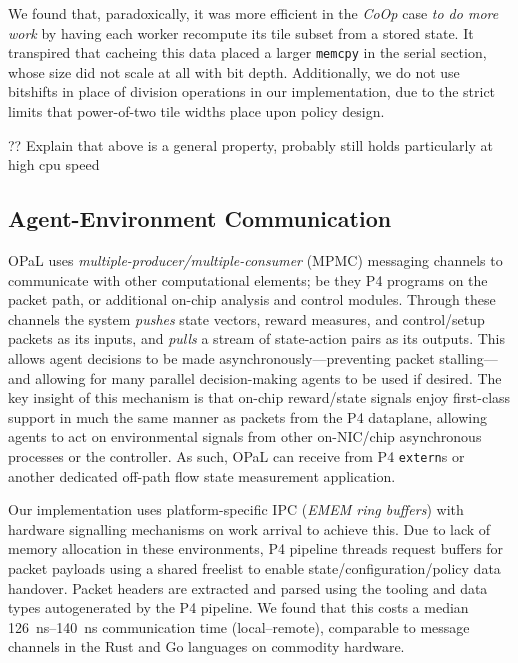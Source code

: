 \documentclass[
sigconf,natbib=false
]{acmart}
\newcommand{\approachshort}{OPaL}
\newcommand{\Coopfw}{\emph{CoOp}}
\begin{document}
We found that, paradoxically, it was more efficient in the \Coopfw{} case \emph{to do more work} by having each worker recompute its tile subset from a stored state.
It transpired that cacheing this data placed a larger \texttt{memcpy} in the serial section, whose size did not scale at all with bit depth.
Additionally, we do not use bitshifts in place of division operations in our implementation, due to the strict limits that power-of-two tile widths place upon policy design.

?? Explain that above is a general property, probably still holds particularly at high cpu speed

\subsection{Agent-Environment Communication}\label{sec:agent-environment-communication}
\approachshort{} uses \emph{multiple-producer/multiple-consumer} (MPMC) messaging channels to communicate with other computational elements; be they P4 programs on the packet path, or additional on-chip analysis and control modules.
Through these channels the system \emph{pushes} state vectors, reward measures, and control/setup packets as its inputs, and \emph{pulls} a stream of state-action pairs as its outputs.
This allows agent decisions to be made asynchronously---preventing packet stalling---and allowing for many parallel decision-making agents to be used if desired.
The key insight of this mechanism is that on-chip reward/state signals enjoy first-class support in much the same manner as packets from the P4 dataplane, allowing agents to act on environmental signals from other on-NIC/chip asynchronous processes or the controller.
As such, \approachshort{} can receive from P4 \texttt{extern}s or another dedicated off-path flow state measurement application.

Our implementation uses platform-specific IPC (\emph{EMEM ring buffers}) with hardware signalling mechanisms on work arrival to achieve this.
Due to lack of memory allocation in these environments, P4 pipeline threads request buffers for packet payloads using a shared freelist to enable state/configuration/policy data handover.
Packet headers are extracted and parsed using the tooling and data types autogenerated by the P4 pipeline.
We found that this costs a median \SIrange{126}{140}{\nano\second} communication time (local--remote), comparable to message channels in the Rust and Go languages on commodity hardware.

\end{document}
